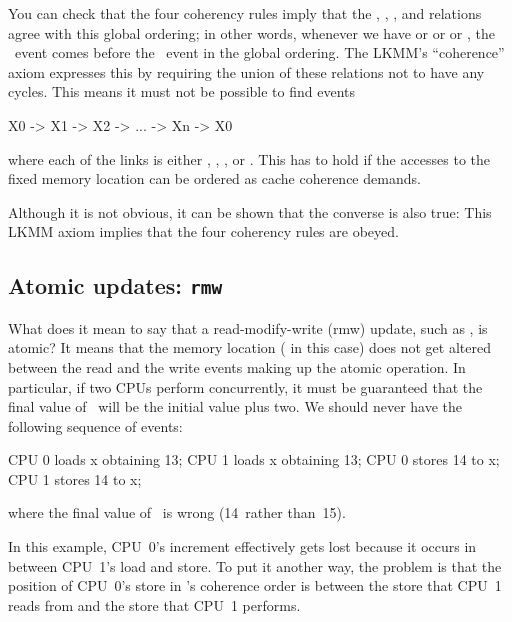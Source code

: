 You can check that the four coherency rules imply that the , , ,
and  relations agree with this global ordering; in other words,
whenever we have  or  or  or , the
~event comes before the ~event in the global ordering.
The LKMM's ``coherence'' axiom expresses this by requiring the union of these
relations not to have any cycles.
This means it must not be possible to find events

\begin{VerbatimU}
	X0 -> X1 -> X2 -> ... -> Xn -> X0
\end{VerbatimU}

\noindent%
where each of the links is either , , , or .
This has to hold if the accesses to the fixed memory location can be
ordered as cache coherence demands.

Although it is not obvious, it can be shown that the converse is also
true:
This LKMM axiom implies that the four coherency rules are obeyed.


\subsection{Atomic updates: \texttt{rmw}}
\label{sec:docs:explanation:Atomic Updates: rmw}

What does it mean to say that a read-modify-write (rmw) update, such
as , is atomic?
It means that the memory location ( in this case) does not get
altered between the read and the write events making up the atomic
operation.
In particular, if two CPUs perform  concurrently,
it must be guaranteed that the final value of~ will be the
initial value plus two.
We should never have the following sequence of events:

\begin{VerbatimU}
	CPU 0 loads x obtaining 13;
	                                CPU 1 loads x obtaining 13;
	CPU 0 stores 14 to x;
	                                CPU 1 stores 14 to x;
\end{VerbatimU}

\noindent%
where the final value of~ is wrong (14~rather than~15).

In this example, CPU~0's increment effectively gets lost because it
occurs in between CPU~1's load and store.
To put it another way, the problem is that the position of CPU~0's
store in 's coherence order is between the store that CPU~1
reads from and the store that CPU~1 performs.

